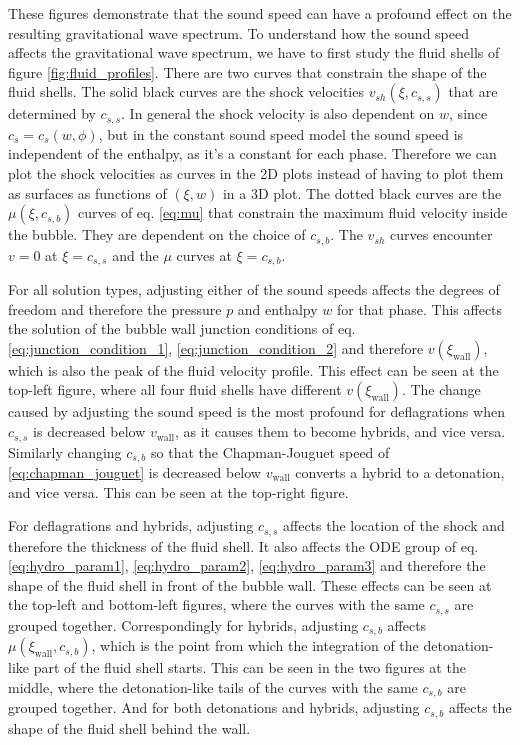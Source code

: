 These figures demonstrate that the sound speed can have a profound effect on the resulting gravitational wave spectrum.
To understand how the sound speed affects the gravitational wave spectrum,
we have to first study the fluid shells of figure \ref{fig:fluid_profiles}.
There are two curves that constrain the shape of the fluid shells.
The solid black curves are the shock velocities $v_{sh}(\xi,c_{s,s})$ that are determined by $c_{s,s}$.
In general the shock velocity is also dependent on $w$, since $c_s = c_s(w,\phi)$,
but in the constant sound speed model the sound speed is independent of the enthalpy,
as it's a constant for each phase.
Therefore we can plot the shock velocities as curves in the 2D plots instead of having to plot them as surfaces as functions of $(\xi,w)$ in a 3D plot.
The dotted black curves are the $\mu(\xi,c_{s,b})$ curves of eq. \eqref{eq:mu} that constrain the maximum fluid velocity inside the bubble.
They are dependent on the choice of $c_{s,b}$.
The $v_{sh}$ curves encounter $v=0$ at $\xi = c_{s,s}$ and the $\mu$ curves at $\xi = c_{s,b}$.

For all solution types, adjusting either of the sound speeds affects the degrees of freedom and therefore the pressure $p$ and enthalpy $w$ for that phase.
This affects the solution of the bubble wall junction conditions of eq. \eqref{eq:junction_condition_1}, \eqref{eq:junction_condition_2} and therefore $v(\xi_\text{wall})$,
which is also the peak of the fluid velocity profile.
This effect can be seen at the top-left figure, where all four fluid shells have different $v(\xi_\text{wall})$.
The change caused by adjusting the sound speed is the most profound for deflagrations when $c_{s,s}$ is decreased below $v_\text{wall}$, as it causes them to become hybrids, and vice versa.
Similarly changing $c_{s,b}$ so that the Chapman-Jouguet speed of \eqref{eq:chapman_jouguet} is decreased below $v_\text{wall}$ converts a hybrid to a detonation, and vice versa.
This can be seen at the top-right figure.

For deflagrations and hybrids, adjusting $c_{s,s}$ affects the location of the shock and therefore the thickness of the fluid shell.
It also affects the ODE group of eq. \eqref{eq:hydro_param1}, \eqref{eq:hydro_param2}, \eqref{eq:hydro_param3} and therefore the shape of the fluid shell in front of the bubble wall.
These effects can be seen at the top-left and bottom-left figures, where the curves with the same $c_{s,s}$ are grouped together.
Correspondingly for hybrids, adjusting $c_{s,b}$ affects $\mu(\xi_\text{wall},c_{s,b})$,
which is the point from which the integration of the detonation-like part of the fluid shell starts.
This can be seen in the two figures at the middle, where the detonation-like tails of the curves with the same $c_{s,b}$ are grouped together.
And for both detonations and hybrids, adjusting $c_{s,b}$ affects the shape of the fluid shell behind the wall.

